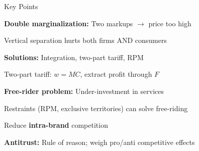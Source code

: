 \documentclass[notes,11pt, aspectratio=169]{beamer}
\newenvironment{wideenumerate}{\enumerate\addtolength{\itemsep}{10pt}}{\endenumerate}
\begin{document}
\begin{frame}{Key Points}
	\vspace{11pt}
	\begin{wideenumerate}
		\item \textbf{Double marginalization:} Two markups $\rightarrow$ price too high
		\item Vertical separation hurts both firms AND consumers
		\item \textbf{Solutions:} Integration, two-part tariff, RPM
		\item Two-part tariff: $w = MC$, extract profit through $F$
		\item \textbf{Free-rider problem:} Under-investment in services
		\item Restraints (RPM, exclusive territories) can solve free-riding
		\item Reduce \textbf{intra-brand} competition
		\item \textbf{Antitrust:} Rule of reason; weigh pro/anti competitive effects
	\end{wideenumerate}
\end{frame}
\end{document}
